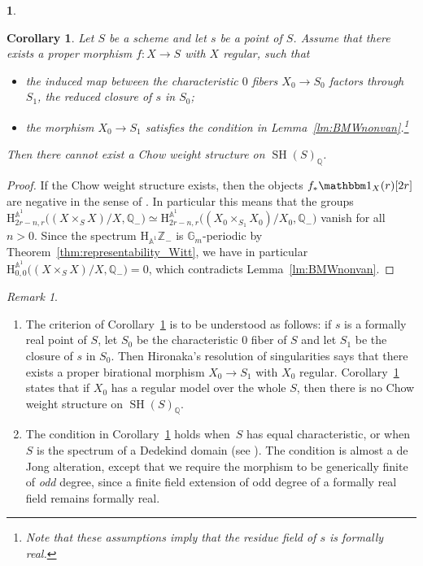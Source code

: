 \documentclass[JEP,XML,SOM,Unicode]{cedram}
\renewcommand{\AA}{\mathbb A}
\newcommand{\un}{\mathbbm 1}
\newcommand{\HA}{\mathrm H_{\AA^1}}
\newcommand{\BA}{\mathrm H^{\AA^1}}
\DeclareMathOperator{\SH}{SH}
\newcommand{\ZZ} {\mathbb Z}
\newcommand{\QQ} {\mathbb Q}
\newtheorem{cor}[thm]{Corollary}
\theoremstyle{remark}
\newtheorem{rem}[thm]{Remark}
\theoremstyle{definition}
\newtheorem{num}[thm]{}
\numberwithin{equation}{thm}
\begin{document}
\begin{num}
\begin{cor}
\label{cor:chowwtnotexist}
Let $S$ be a scheme and let $s$ be a point of $S$. Assume that there exists a proper morphism $f:X\to S$ with $X$ regular, such that
\begin{itemize}
\item the induced map between the characteristic $0$ fibers $X_0\to S_0$ factors through $S_1$, the reduced closure of $s$ in $S_0$;
\item the morphism $X_0\to S_1$ satisfies the condition in Lemma~\ref{lm:BMWnonvan}.\footnote{Note that these assumptions imply that the residue field of $s$ is formally real.}
\end{itemize}
Then there cannot exist a Chow weight structure on $\SH(S)_{\QQ}$.
\end{cor}
\begin{proof}
If the Chow weight structure exists, then the objects $f_*\un_X(r)[2r]$ are negative in the sense of \cite[Def.\,1.5\,VII]{Bondarkorweight}. In particular this means that the groups $\BA_{2r-n,r}\big((X\times_{S}X)/X,\QQ_-\big)\simeq\BA_{2r-n,r}\big((X_0\times_{S_1}X_0)/X_0,\QQ_-\big)$ vanish for all $n>0$. Since the spectrum $\HA \ZZ_-$ is $\mathbb{G}_m$-periodic by Theorem~\ref{thm:representability_Witt}, we have in particular $\BA_{0,0}\big((X\times_{S}X)/X,\QQ_-\big)=0$, which contradicts Lemma~\ref{lm:BMWnonvan}.
\end{proof}

\skpt
\begin{rem}
\begin{enumerate}
\item
The criterion of Corollary~\ref{cor:chowwtnotexist} is to be understood as follows: if $s$ is a formally real point of $S$, let $S_0$ be the characteristic $0$ fiber of $S$ and let $S_1$ be the closure of $s$ in $S_0$. Then Hironaka's resolution of singularities says that there exists a proper birational morphism $X_0\to S_1$ with $X_0$ regular. Corollary~\ref{cor:chowwtnotexist} states that if $X_0$ has a regular model over the whole $S$, then there is no Chow weight structure on $\SH(S)_{\QQ}$.

\item
The condition in Corollary~\ref{cor:chowwtnotexist} holds when~$S$ has equal characteristic, or when~$S$ is the spectrum of a Dedekind domain (see \cite[1.2.2]{Scholl}). The condition is almost a de Jong alteration, except that we require the morphism to be generically finite of \emph{odd} degree, since a finite field extension of odd degree of a formally real field remains formally real.
\end{enumerate}
\end{rem}

\end{num}
\end{document}
